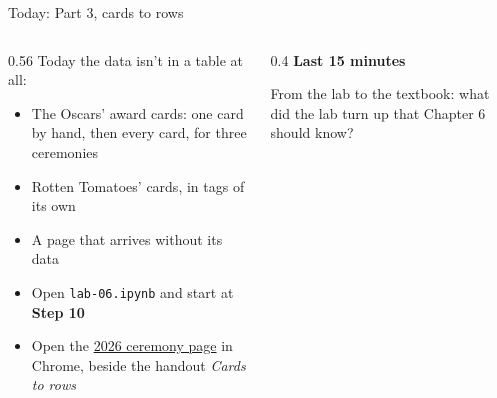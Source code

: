 \documentclass[9pt,aspectratio=169]{beamer}
\begin{document}
\begin{frame}{Today: Part 3, cards to rows}
    \begin{columns}[T]
        \begin{column}{0.56\textwidth}
            Today the data isn't in a table at all:
            \begin{itemize}\small
                \item The Oscars' award cards: one card by hand, then every card, for three ceremonies
                \item Rotten Tomatoes' cards, in tags of its own
                \item A page that arrives without its data
            \end{itemize}

            \medskip
            \begin{itemize}\small
                \item Open \texttt{lab-06.ipynb} and start at \textbf{Step 10}
                \item Open the \href{https://www.oscars.org/oscars/ceremonies/2026}{2026 ceremony page} in Chrome, beside the handout \textit{Cards to rows}
            \end{itemize}
        \end{column}
        \begin{column}{0.4\textwidth}
            \textbf{Last 15 minutes}\\[2pt]
            {\footnotesize From the lab to the textbook: what did the lab turn up that Chapter 6 should know?\par}
        \end{column}
    \end{columns}
\end{frame}
\end{document}
